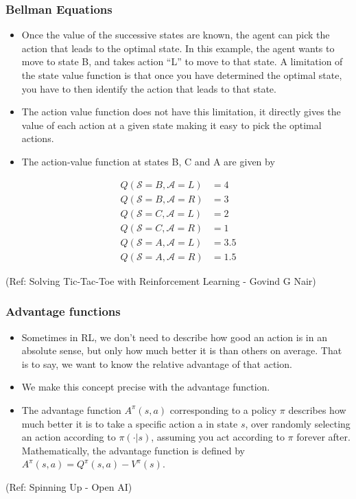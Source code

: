 \begin{frame}[fragile]\frametitle{Bellman Equations}



\begin{itemize}
\item Once the value of the successive states are known, the agent can pick the action that leads to the optimal state. In this example, the agent wants to move to state B, and takes action ``L'' to move to that state. A limitation of the state value function is that once you have determined the optimal state, you have to then identify the action that leads to that state.
\item The action value function does not have this limitation, it directly gives the value of each action at a given state making it easy to pick the optimal actions.
\item The action-value function at states B, C and A are given by
\end{itemize}


\begin{align*}
Q(\mathcal{S}=B,\mathcal{A}=L) &= 4\\
Q(\mathcal{S}=B,\mathcal{A}=R) &= 3\\
Q(\mathcal{S}=C,\mathcal{A}=L) &= 2\\
Q(\mathcal{S}=C,\mathcal{A}=R) &= 1\\
Q(\mathcal{S}=A,\mathcal{A}=L) &= 3.5\\
Q(\mathcal{S}=A,\mathcal{A}=R) &= 1.5
\end{align*}


{\tiny (Ref: Solving Tic-Tac-Toe with Reinforcement Learning - Govind G Nair)}

\end{frame}

\begin{frame}[fragile]\frametitle{Advantage  functions}

\begin{itemize}
\item Sometimes in RL, we don't need to describe how good an action is in an absolute sense, but only how much better it is than others on average. That is to say, we want to know the relative advantage of that action. 
\item We make this concept precise with the advantage function.
\item The advantage function $A^{\pi}(s,a)$ corresponding to a policy $\pi$ describes how much better it is to take a specific action a in state $s$, over randomly selecting an action according to $\pi(\cdot|s)$, assuming you act according to $\pi$ forever after. Mathematically, the advantage function is defined by $A^{\pi}(s,a) = Q^{\pi}(s,a) - V^{\pi}(s)$.
\end{itemize}

{\tiny (Ref: Spinning Up - Open AI)}
\end{frame}



